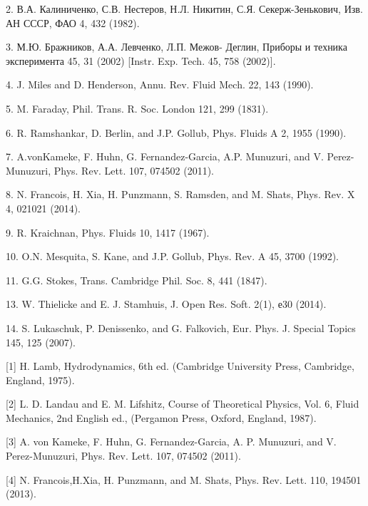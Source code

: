 \begin{thebibliography}{99}
2. В.А. Калиниченко, С.В. Нестеров, Н.Л. Никитин, С.Я. Секерж-Зенькович, Изв. АН СССР, ФАО 4, 432 (1982).

3. М.Ю. Бражников, А.А. Левченко, Л.П. Межов- Деглин, Приборы и техника эксперимента 45, 31 (2002) [Instr. Exp. Tech. 45, 758 (2002)].

4. J. Miles and D. Henderson, Annu. Rev. Fluid Mech. 22, 143 (1990).

5. M. Faraday, Phil. Trans. R. Soc. London 121, 299 (1831).

6. R. Ramshankar, D. Berlin, and J.P. Gollub, Phys. Fluids A 2, 1955 (1990).

7. A.vonKameke, F. Huhn, G. Fernandez-Garcia, A.P. Munuzuri, and V. Perez-Munuzuri, Phys. Rev. Lett. 107, 074502 (2011).

8. N. Francois, H. Xia, H. Punzmann, S. Ramsden, and M. Shats, Phys. Rev. X 4, 021021 (2014).

9. R. Kraichnan, Phys. Fluids 10, 1417 (1967).

10. O.N. Mesquita, S. Kane, and J.P. Gollub, Phys. Rev. A 45, 3700 (1992).

11. G.G. Stokes, Trans. Cambridge Phil. Soc. 8, 441 (1847).


13. W. Thielicke and E. J. Stamhuis, J. Open Res. Soft. 2(1), е30 (2014).

14. S. Lukaschuk, P. Denissenko, and G. Falkovich, Eur. Phys. J. Special Topics 145, 125 (2007).


[1] H. Lamb, Hydrodynamics, 6th ed. (Cambridge University Press, Cambridge, England, 1975).

[2] L. D. Landau and E. M. Lifshitz, Course of Theoretical Physics, Vol. 6, Fluid Mechanics, 2nd English ed., (Pergamon Press, Oxford, England, 1987).

[3] A. von Kameke, F. Huhn, G. Fernandez-Garcia, A. P. Munuzuri, and V. Perez-Munuzuri, Phys. Rev. Lett. 107, 074502 (2011).

[4] N. Francois,H.Xia, H. Punzmann, and M. Shats, Phys. Rev. Lett. 110, 194501 (2013).


\end{thebibliography}

